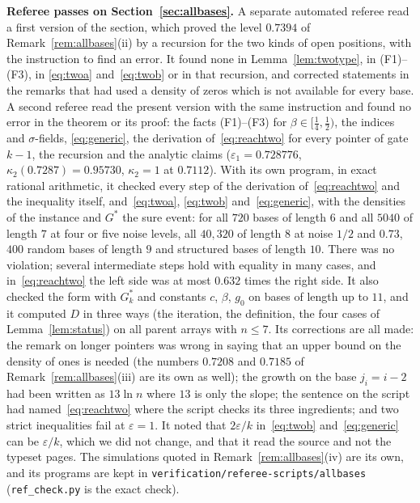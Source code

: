 \documentclass[11pt]{amsart}
\theoremstyle{definition}
\theoremstyle{remark}
\newcommand{\eps}{\varepsilon}
\begin{document}
\medskip\noindent\textbf{Referee passes on Section~\ref{sec:allbases}.} A separate automated
referee read a first version of the section, which proved the level $0.7394$ of
Remark~\ref{rem:allbases}(ii) by a recursion for the two kinds of open positions, with the
instruction to find an error. It found none in Lemma~\ref{lem:twotype}, in (F1)--(F3), in
\eqref{eq:twoa} and~\eqref{eq:twob} or in that recursion, and corrected statements in the remarks
that had used a density of zeros which is not available for every base. A second referee read
the present version with the same instruction and found no error in the theorem or its proof: the
facts (F1)--(F3) for $\beta\in[\frac14,\frac12)$, the indices and $\sigma$-fields, \eqref{eq:generic},
the derivation of~\eqref{eq:reachtwo} for every pointer of gate $k-1$, the recursion and the
analytic claims ($\eps_1=0.728776$, $\kappa_2(0.7287)=0.95730$, $\kappa_2=1$ at $0.7112$). With its
own program, in exact rational arithmetic, it checked every step of the derivation
of~\eqref{eq:reachtwo} and the inequality itself, and~\eqref{eq:twoa}, \eqref{eq:twob}
and~\eqref{eq:generic}, with the densities of the instance and $G^*$ the sure event: for all $720$
bases of length $6$ and all $5040$ of length $7$ at four or five noise levels, all $40{,}320$ of
length $8$ at noise $1/2$ and $0.73$, $400$ random bases of length $9$ and structured bases of
length $10$. There was no violation; several intermediate steps hold with equality in many
cases, and in~\eqref{eq:reachtwo} the left side was at most $0.632$ times the right side. It also
checked the form with $G^*_k$ and constants $c$, $\beta$, $g_0$ on bases of length up to $11$, and
it computed $D$ in three ways (the iteration, the definition, the four cases of
Lemma~\ref{lem:status}) on all parent arrays with $n\le7$. Its corrections are all made: the
remark on longer pointers was wrong in saying that an upper bound on the density of ones is
needed (the numbers $0.7208$ and $0.7185$ of Remark~\ref{rem:allbases}(iii) are its own as well);
the growth on the base $j_i=i-2$ had been written as $13\ln n$ where $13$ is only the slope; the
sentence on the script had named~\eqref{eq:reachtwo} where the script checks its three
ingredients; and two strict inequalities fail at $\eps=1$. It noted that $2\eps/k$
in~\eqref{eq:twob} and~\eqref{eq:generic} can be $\eps/k$, which we did not change, and that it
read the source and not the typeset pages. The simulations quoted in
Remark~\ref{rem:allbases}(iv) are its own, and its programs are kept in
\texttt{verification/referee-scripts/allbases} (\texttt{ref\_check.py} is the exact check).
\end{document}
